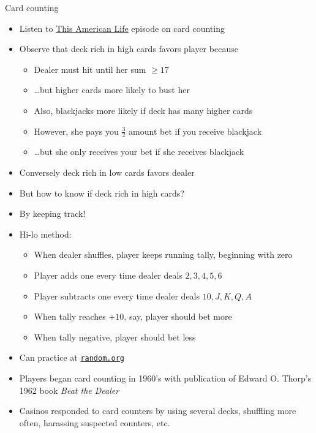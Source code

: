 \documentclass[handout]{beamer}
\theoremstyle{definition}
\begin{document}
\begin{frame}{Card counting}
\begin{itemize}
\item Listen to
\href{http://www.thisamericanlife.org/radio-archives/episode/466/blackjack}
{\color{blue}This American Life} episode on card counting
\item Observe that deck rich in high cards favors player because
\begin{itemize}
\item Dealer must hit until her sum $\ge 17$
\item \dots but higher cards more likely to bust her
\item Also, blackjacks more likely if deck has many higher cards
\item However, she pays you $\frac{3}{2}$ amount bet
if you receive blackjack
\item \dots but she only receives your bet if she receives blackjack
\end{itemize}
\item Conversely deck rich in low cards favors dealer
\end{itemize}
\end{frame}

\begin{frame}
\begin{itemize}
\item But how to know if deck rich in high cards?
\item By keeping track!
\item Hi-lo method:
\begin{itemize}
\item When dealer shuffles, player keeps running tally,
beginning with zero
\item Player adds one every time dealer deals $2,3,4,5,6$
\item Player subtracts one every time dealer deals $10,J,K,Q,A$
\item When tally reaches $+10$, say, player should bet more
\item When tally negative, player should bet less
\end{itemize}
\item Can practice at \href{http://www.random.org/playing-cards}
{\color{blue}\tt random.org}
\item Players began card counting in 1960's with publication
of Edward O. Thorp's 1962 book {\em Beat the Dealer}
\item Casinos responded to card counters by using several decks,
shuffling more often, harassing suspected counters, etc.
\end{itemize}
\end{frame}
\end{document}
